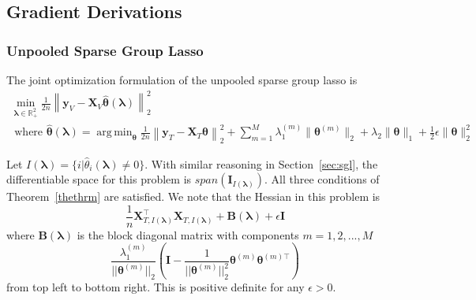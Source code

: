 \documentclass[10pt,letterpaper]{article}
\DeclareMathOperator*{\argmin}{arg\,min}
\begin{document}
\subsection{Gradient Derivations}

\subsubsection{Unpooled Sparse Group Lasso}

The joint optimization formulation of the unpooled sparse group lasso is
\begin{equation}
\begin{array}{c}
\min_{\boldsymbol{\lambda} \in \mathbb{R}^2_{+}} \frac{1}{2n}
\left \| \boldsymbol{y}_V - \boldsymbol{X}_V \hat{\boldsymbol{\theta}}(\boldsymbol{\lambda}) \right \|^2_2 \\
\text{ where }
\hat{\boldsymbol{\theta}}(\boldsymbol{\lambda}) =
\argmin_{\boldsymbol{\theta}} \frac{1}{2n} 
\left \| \boldsymbol{y}_T - \boldsymbol{X}_T \boldsymbol{\theta} \right \|^2_2
+ \sum_{m=1}^M \lambda_1^{(m)} \| \boldsymbol\theta^{(m)} \|_2
+ \lambda_2 \| \boldsymbol\theta \|_1
+ \frac{1}{2} \epsilon \| \boldsymbol\theta \|_2^2
\end{array}
\label{eq:unpooledJointOpt}
\end{equation}

Let $I(\boldsymbol \lambda) = \{i | \hat \theta_i(\boldsymbol \lambda) \ne 0 \}$. With similar reasoning in Section~\ref{sec:sgl}, the differentiable space for this problem is $span(\boldsymbol I_{I(\boldsymbol \lambda)})$. All three conditions of Theorem~\ref{thethrm} are satisfied. We note that the Hessian in this problem is
\begin{equation}
\frac{1}{n} \boldsymbol X_{T, I(\boldsymbol \lambda)}^\top \boldsymbol X_{T, I(\boldsymbol \lambda)} + \boldsymbol B(\boldsymbol \lambda) + \epsilon \boldsymbol I
\end{equation}
where $\boldsymbol B(\boldsymbol \lambda)$ is the block diagonal matrix with components  $m=1,2,...,M$
\begin{equation}
\frac{\lambda_1^{(m)}}{|| \boldsymbol \theta^{(m)}||_2}
\left (
\boldsymbol I - 
\frac{1}{|| \boldsymbol \theta^{(m)}||_2^2} \boldsymbol \theta^{(m)} \boldsymbol \theta^{(m) \top}
\right )
\end{equation}
from top left to bottom right. This is positive definite for any $\epsilon > 0$.
\end{document}

